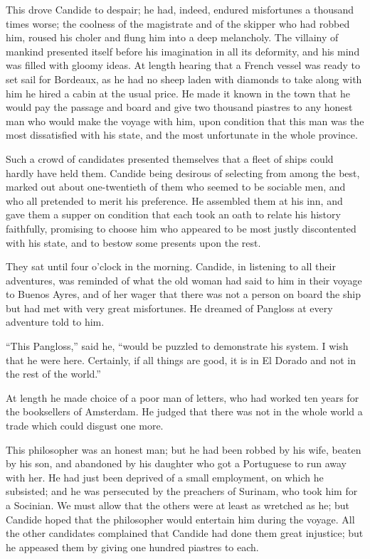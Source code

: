 This drove Candide to despair; he had, indeed, endured misfortunes a thousand times worse; the coolness of the magistrate and of the skipper who had robbed him, roused his choler and flung him into a deep melancholy. The villainy of mankind presented itself before his imagination in all its deformity, and his mind was filled with gloomy ideas. At length hearing that a French vessel was ready to set sail for Bordeaux, as he had no sheep laden with diamonds to take along with him he hired a cabin at the usual price. He made it known in the town that he would pay the passage and board and give two thousand piastres to any honest man who would make the voyage with him, upon condition that this man was the most dissatisfied with his state, and the most unfortunate in the whole province.

Such a crowd of candidates presented themselves that a fleet of ships could hardly have held them. Candide being desirous of selecting from among the best, marked out about one-twentieth of them who seemed to be sociable men, and who all pretended to merit his preference. He assembled them at his inn, and gave them a supper on condition that each took an oath to relate his history faithfully, promising to choose him who appeared to be most justly discontented with his state, and to bestow some presents upon the rest.

They sat until four o'clock in the morning. Candide, in listening to all their adventures, was reminded of what the old woman had said to him in their voyage to Buenos Ayres, and of her wager that there was not a person on board the ship but had met with very great misfortunes. He dreamed of Pangloss at every adventure told to him.

``This Pangloss,'' said he, ``would be puzzled to demonstrate his system. I wish that he were here. Certainly, if all things are good, it is in El Dorado and not in the rest of the world.''

At length he made choice of a poor man of letters, who had worked ten years for the booksellers of Amsterdam. He judged that there was not in the whole world a trade which could disgust one more.

This philosopher was an honest man; but he had been robbed by his wife, beaten by his son, and abandoned by his daughter who got a Portuguese to run away with her. He had just been deprived of a small employment, on which he subsisted; and he was persecuted by the preachers of Surinam, who took him for a Socinian. We must allow that the others were at least as wretched as he; but Candide hoped that the philosopher would entertain him during the voyage. All the other candidates complained that Candide had done them great injustice; but he appeased them by giving one hundred piastres to each.


